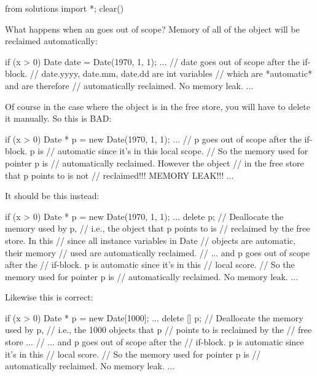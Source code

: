 \begin{python0}
from solutions import *; clear()
\end{python0}

What happens when an  goes out of scope? Memory of all
 of the object will be reclaimed
automatically:

\begin{consolethree}[escapeinside=||]
if (x > 0)
{
    Date date = Date(1970, 1, 1);
    ...
} // date goes out of scope after the if-block.
  // date.yyyy, date.mm, date.dd are int variables
  // which are *automatic* and are therefore
  // automatically reclaimed. No memory leak.
...
\end{consolethree}

Of course in the case where the object is in the free store, you will
have to delete it manually. So this is BAD:

\begin{consolethree}[escapeinside=||]
if (x > 0)
{
    Date * p = new Date(1970, 1, 1);
    ...
} // p goes out of scope after the if-block. p is
  // automatic since it's in this local scope.
  // So the memory used for pointer p is
  // automatically reclaimed. However the object
  // in the free store that p points to is not
  // reclaimed!!! MEMORY LEAK!!!
...
\end{consolethree}

It should be this instead:

\begin{consolethree}[escapeinside=||]
if (x > 0)
{
    Date * p = new Date(1970, 1, 1);
    ...
    delete p; // Deallocate the memory used by p,
              // i.e., the object that p points to is
              // reclaimed by the free store. In this
              // since all instance variables in Date
              // objects are automatic, their memory
              // used are automatically reclaimed.
} // ... and p goes out of scope after the
  // if-block. p is automatic since it's in this
  // local score.
  // So the memory used for pointer p is
  // automatically reclaimed. No memory leak.
...
\end{consolethree}

Likewise this is correct:

\begin{consolethree}[escapeinside=||]
if (x > 0)
{
    Date * p = new Date[1000];
    ...
    delete [] p; // Deallocate the memory used by p,
                 // i.e., the 1000 objects that p
                 // points to is reclaimed by the
                 // free store ...
} // ... and p goes out of scope after the
  // if-block. p is automatic since it's in this
  // local score.
  // So the memory used for pointer p is
  // automatically reclaimed. No memory leak.
...
\end{consolethree}


